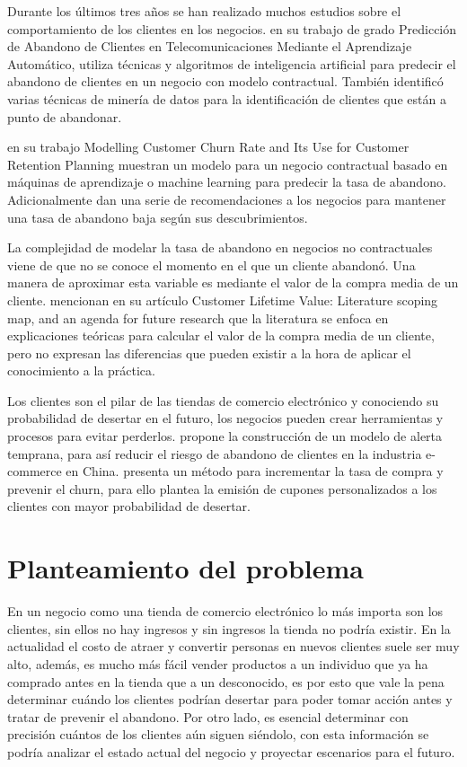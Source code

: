 Durante los últimos tres años se han realizado muchos estudios sobre el comportamiento de los clientes en los negocios. \cite{falla2021} en su trabajo de grado Predicción de Abandono de Clientes en Telecomunicaciones Mediante el Aprendizaje Automático, utiliza técnicas y algoritmos de inteligencia artificial para predecir el abandono de clientes en un negocio con modelo contractual. También identificó varias técnicas de minería de datos para la identificación de clientes que están a punto de abandonar.



\cite{sinha2022} en su trabajo Modelling Customer Churn Rate and Its Use for Customer Retention Planning muestran un modelo para un negocio contractual basado en máquinas de aprendizaje o machine learning para predecir la tasa de abandono. Adicionalmente dan una serie de recomendaciones a los negocios para mantener una tasa de abandono baja según sus descubrimientos.



La complejidad de modelar la tasa de abandono en negocios no contractuales viene de que no se conoce el momento en el que un cliente abandonó. Una manera de aproximar esta variable es mediante el valor de la compra media de un cliente. \cite{abdolvand2021} mencionan en su artículo Customer Lifetime Value: Literature scoping map, and an agenda for future research que la literatura se enfoca en explicaciones teóricas para calcular el valor de la compra media de un cliente, pero no expresan las diferencias que pueden existir a la hora de aplicar el conocimiento a la práctica.

Los clientes son el pilar de las tiendas de comercio electrónico y conociendo su probabilidad de desertar en el futuro, los negocios pueden crear herramientas y procesos para evitar perderlos. \cite{fu2022} propone la construcción de un modelo de alerta temprana, para así reducir el riesgo de abandono de clientes en la industria e-commerce en China. \cite{seo2022prevention} presenta un método para incrementar la tasa de compra y prevenir el churn, para ello plantea la emisión de cupones personalizados a los clientes con mayor probabilidad de desertar.


\section{Planteamiento del problema}

En un negocio como una tienda de comercio electrónico lo más importa son los clientes, sin ellos no hay ingresos y sin ingresos la tienda no podría existir. En la actualidad el costo de atraer y convertir personas en nuevos clientes suele ser muy alto, además, es mucho más fácil vender productos a un individuo que ya ha comprado antes en la tienda que a un desconocido, es por esto que vale la pena determinar cuándo los clientes podrían desertar para poder tomar acción antes y tratar de prevenir el abandono. Por otro lado, es esencial determinar con precisión cuántos de los clientes aún siguen siéndolo, con esta información se podría analizar el estado actual del negocio y proyectar escenarios para el futuro.


